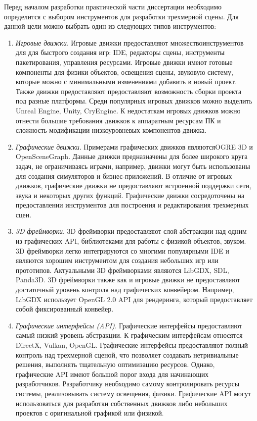 Перед началом разработки практической части диссертации необходимо определится с
выбором инструментов для разработки трехмерной сцены. Для данной цели можно
выбрать один из следующих типов инструментов:
\begin{enumerate}
    \item \emph{Игровые движки}. Игровые движки предоставляют множество\break{}инструментов для
        для быстрого создания игр: IDE, редакторы сцены, инструменты
        пакетирования, управления ресурсами. Игровые движки имеют готовые
        компоненты для физики объектов, освещения сцены, звуковую систему,
        которые можно с минимальными изменениями добавить в новый проект. Также
        движки предоставляют предоставляют возможность сборки проекта под разные
        платформы. Среди популярных игровых движков можно выделить Unreal
        Engine, Unity, CryEngine. К недостаткам игровых движков можно отнести
        большие требования движков к аппаратным ресурсам ПК и сложность
        модификации низкоуровневых компонентов движка.
    \item \emph{Графические движки}. Примерами графических движков
        являются\break{}OGRE 3D и OpenSceneGraph. Данные движки предназначены
        для более широкого круга задач, не ограничиваясь играми, например,
        движки могут быть использованы для создания симуляторов и
        бизнес-приложений. В отличие от игровых движков, графические движки не
        предоставляют встроенной поддержки сети, звука и некоторых других
        функций. Графические движки сосредоточены на предоставлении инструментов
        для построения и редактирования трехмерных сцен.
    \item \emph{3D фреймворки}. 3D фреймворки предоставляют слой абстракции над
        одним из графических API, библиотеками для работы с физикой объектов,
        звуком. 3D фреймворки легко интегрируются со многими популярными IDE и
        являются хорошим инструментом для создания небольших игр или прототипов.
        Актуальными 3D фреймворками являются LibGDX, SDL, Panda3D. 3D фреймворки
        также как и игровые движки не предоставляют достаточный уровень контроля
        над графических конвейером. Например, LibGDX использует OpenGL 2.0 API
        для рендеринга, который предоставляет собой фиксированный конвейер.
    \item \emph{Графические интерфейсы (API)}. Графические интерфейсы
        предоставляют самый низкий уровень абстракции. К графическим интерфейсам
        относятся DirectX, Vulkan, OpenGL\@. Графические интерфейсы
        предоставляют полный контроль над трехмерной сценой, что позволяет
        создавать нетривиальные решения, выполнять тщательную оптимизацию
        ресурсов. Однако, графические API имеют большой порог входа для
        начинающих разработчиков. Разработчику необходимо самому контролировать
        ресурсы системы, реализовывать систему освещения, физики. Графические
        API могут использоваться для разработки собственных движков либо
        небольших проектов с оригинальной графикой или физикой.
\end{enumerate}

